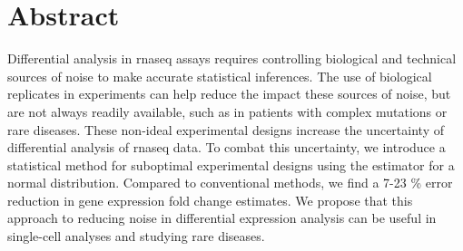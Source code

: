 \section{Abstract}

Differential analysis in \gls{rnaseq} assays requires controlling biological and technical sources of noise to make accurate statistical inferences.
The use of biological replicates in experiments can help reduce the impact these sources of noise, but are not always readily available, such as in patients with complex mutations or rare diseases.
These non-ideal experimental designs increase the uncertainty of differential analysis of \gls{rnaseq} data.
To combat this uncertainty, we introduce a statistical method for suboptimal experimental designs using the  estimator for a normal distribution.
Compared to conventional methods, we find a 7-23 \% error reduction in gene expression fold change estimates.
We propose that this approach to reducing noise in differential expression analysis can be useful in single-cell analyses and studying rare diseases.
